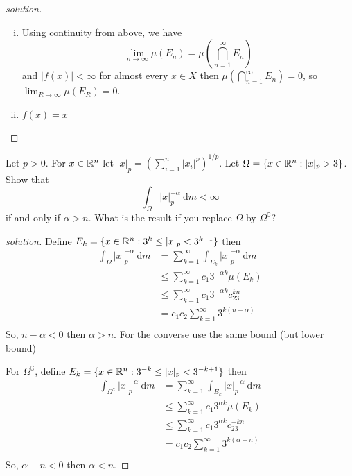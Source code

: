 \begin{proof}[solution]
  \begin{enumerate}[(i)]
    \item Using continuity from above, we have
    \[\lim_{n\to\infty} \mu(E_n) = \mu\left(\bigcap_{n=1}^\infty E_n\right)\]
    and $|f(x)| < \infty$ for almost every $x \in X$ then $\mu\left(\bigcap_{n=1}^\infty E_n\right) = 0$, so $\lim_{R\to\infty} \mu(E_R) = 0$.
    \item $f(x) = x$
  \end{enumerate}
\end{proof}

\begin{problem}
  Let $p > 0$. For $x \in \mathbb R^n$ let $|x|_p = (\sum_{i=1}^n |x_i|^p)^{1/p}$. Let $\Omega = \{x \in \mathbb R^n : |x|_p > 3\}$.
  Show that 
  \[\int_{\Omega} |x|_p^{-\alpha}\ \mathrm{d}m < \infty\]
  if and only if $\alpha > n$. What is the result if you replace $\Omega$ by $\Omega^\complement$?
\end{problem}

\begin{proof}[solution]
  Define $E_k = \{x \in \mathbb R^n : 3^k \le |x|_p < 3^{k+1}\}$ then
  \begin{align*}
    \int_{\Omega} |x|_p^{-\alpha}\ \mathrm{d}m &= \sum_{k=1}^\infty \int_{E_k} |x|_p^{-\alpha}\ \mathrm{d}m\\
    &\le \sum_{k=1}^\infty c_1 3^{-\alpha k}\mu(E_k)\\
    &\le \sum_{k=1}^\infty c_1 3^{-\alpha k}c_23^{kn}\\
    &= c_1c_2\sum_{k=1}^\infty 3^{k(n - \alpha)}\\
  \end{align*}
  So, $n - \alpha < 0$ then $\alpha > n$. For the converse use the same bound (but lower bound)
  
  For $\Omega^\complement$, define $E_k = \{x \in \mathbb R^n : 3^{-k} \le |x|_p < 3^{-k+1}\}$ then
  \begin{align*}
    \int_{\Omega^\complement} |x|_p^{-\alpha}\ \mathrm{d}m &= \sum_{k=1}^\infty \int_{E_k} |x|_p^{-\alpha}\ \mathrm{d}m\\
    &\le \sum_{k=1}^\infty c_1 3^{\alpha k}\mu(E_k)\\
    &\le \sum_{k=1}^\infty c_1 3^{\alpha k}c_23^{-kn}\\
    &= c_1c_2\sum_{k=1}^\infty 3^{k(\alpha - n)}\\
  \end{align*}
  So, $\alpha - n < 0$ then $\alpha < n$.
\end{proof}
